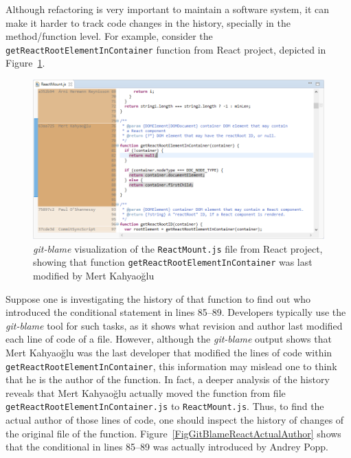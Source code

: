 Although refactoring is very important to maintain a software system, it can make it harder to track code changes in the history, specially in the method/function level.
For example, consider the \texttt{getReactRootElementInContainer} function from React project, depicted in Figure~\ref{FigGitBlameReact}.
\begin{figure}[htbp]
\centering
\includegraphics[width=\linewidth]{img/git-blame-react.png}
\caption{\textit{git-blame} visualization of the \texttt{ReactMount.js} file from React project, showing that function \texttt{getReactRootElementInContainer} was last modified by Mert Kahyao\u{g}lu}
\label{FigGitBlameReact}
\end{figure}
Suppose one is investigating the history of that function to find out who introduced the conditional statement in lines 85--89. Developers typically use the \textit{git-blame} tool for such tasks, as it shows what revision and author last modified each line of code of a file. However, although the \textit{git-blame} output shows that Mert Kahyao\u{g}lu was the last developer that modified the lines of code within \texttt{getReactRootElementInContainer}, this information may mislead one to think that he is the author of the function.
In fact, a deeper analysis of the history reveals that Mert Kahyao\u{g}lu actually moved the function from file \texttt{getReactRootElementInContainer.js} to \texttt{ReactMount.js}.
Thus, to find the actual author of those lines of code, one should inspect the history of changes of the original file of the function. Figure~\ref{FigGitBlameReactActualAuthor} shows that the conditional in lines 85--89 was actually introduced by Andrey Popp.



